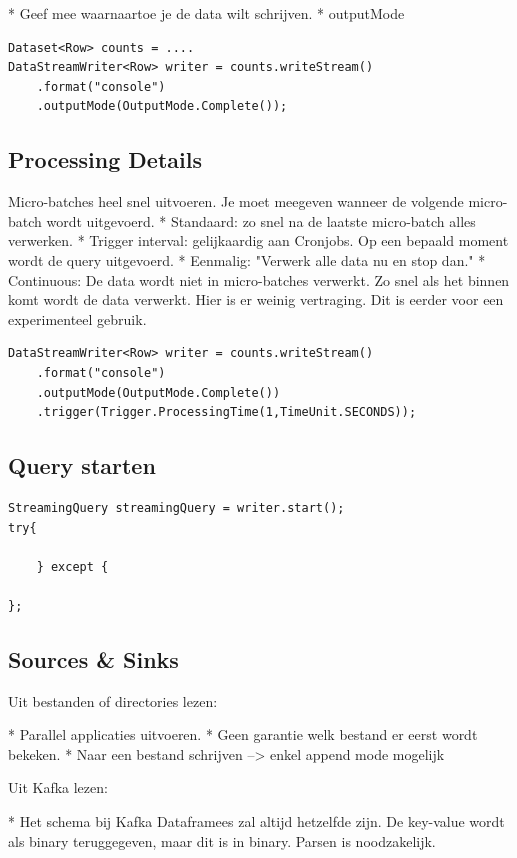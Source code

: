 \documentclass[a4paper,10pt,twoside]{report}
\begin{document}
* Geef mee waarnaartoe je de data wilt schrijven.
* outputMode

\begin{lstlisting}
Dataset<Row> counts = ....
DataStreamWriter<Row> writer = counts.writeStream()
	.format("console")
	.outputMode(OutputMode.Complete());
\end{lstlisting}

\subsection{Processing Details}

Micro-batches heel snel uitvoeren. Je moet meegeven wanneer de volgende micro-batch wordt uitgevoerd. 
* Standaard: zo snel na de laatste micro-batch alles verwerken.
* Trigger interval: gelijkaardig aan Cronjobs. Op een bepaald moment wordt de query uitgevoerd.
* Eenmalig: "Verwerk alle data nu en stop dan."
* Continuous: De data wordt niet in micro-batches verwerkt. Zo snel als het binnen komt wordt de data verwerkt. Hier is er weinig vertraging. Dit is eerder voor een experimenteel gebruik.

\begin{lstlisting}
DataStreamWriter<Row> writer = counts.writeStream()
	.format("console")
	.outputMode(OutputMode.Complete())
	.trigger(Trigger.ProcessingTime(1,TimeUnit.SECONDS));
\end{lstlisting}


\subsection{Query starten}

\begin{lstlisting}
StreamingQuery streamingQuery = writer.start();
try{
	
	} except {
	
};
\end{lstlisting}

\subsection{Sources \& Sinks}

Uit bestanden of directories lezen:

* Parallel applicaties uitvoeren.
* Geen garantie welk bestand er eerst wordt bekeken.
* Naar een bestand schrijven --> enkel append mode mogelijk

Uit Kafka lezen:

* Het schema bij Kafka Dataframees zal altijd hetzelfde zijn. De key-value wordt als binary teruggegeven, maar dit is in binary. Parsen is noodzakelijk.
\end{document}
